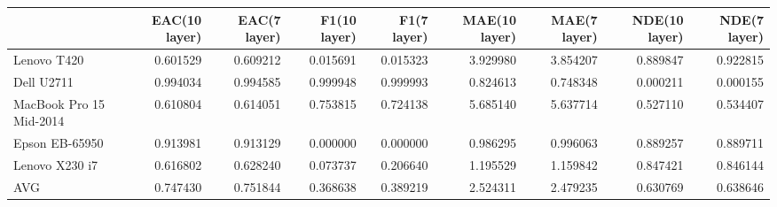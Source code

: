 \begin{tabular}{lrrrrrrrr}
\toprule
{} &  EAC(10 layer) &  EAC(7 layer) &  F1(10 layer) &  F1(7 layer) &  MAE(10 layer) &  MAE(7 layer) &  NDE(10 layer) &  NDE(7 layer) \\
\midrule
Lenovo T420             &       0.601529 &      0.609212 &      0.015691 &     0.015323 &       3.929980 &      3.854207 &       0.889847 &      0.922815 \\
Dell U2711              &       0.994034 &      0.994585 &      0.999948 &     0.999993 &       0.824613 &      0.748348 &       0.000211 &      0.000155 \\
MacBook Pro 15 Mid-2014 &       0.610804 &      0.614051 &      0.753815 &     0.724138 &       5.685140 &      5.637714 &       0.527110 &      0.534407 \\
Epson EB-65950          &       0.913981 &      0.913129 &      0.000000 &     0.000000 &       0.986295 &      0.996063 &       0.889257 &      0.889711 \\
Lenovo X230 i7          &       0.616802 &      0.628240 &      0.073737 &     0.206640 &       1.195529 &      1.159842 &       0.847421 &      0.846144 \\
AVG                     &       0.747430 &      0.751844 &      0.368638 &     0.389219 &       2.524311 &      2.479235 &       0.630769 &      0.638646 \\
\bottomrule
\end{tabular}
